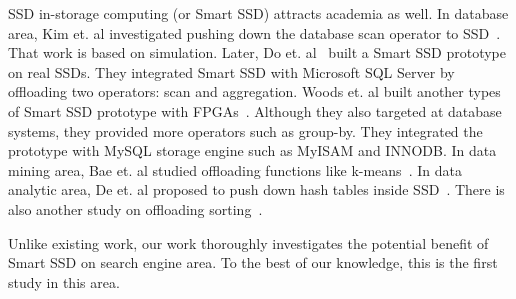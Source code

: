 SSD in-storage computing (or Smart SSD) attracts academia as well. In database area, Kim et. al investigated pushing down the database scan operator to SSD~\cite{KimOPCL11}. That work is based on simulation. Later, Do et. al~\cite{Do2013QPS} built a Smart SSD prototype on real SSDs. They integrated Smart SSD with Microsoft SQL Server by offloading two operators: scan and aggregation. Woods et. al built another types of Smart SSD prototype with FPGAs~\cite{WoodsIA14}. Although they also targeted at database systems, they provided more operators such as group-by. They integrated the prototype with MySQL storage engine such as MyISAM and INNODB. In data mining area, Bae et. al studied offloading functions like k-means~\cite{BaeKKOP13}. In data analytic area, De et. al proposed to push down hash tables inside SSD~\cite{De2013}. There is also another study on offloading sorting~\cite{Young14}.

Unlike existing work, our work thoroughly investigates the potential benefit of Smart SSD on search engine area. To the best of our knowledge, this is the first study in this area.
